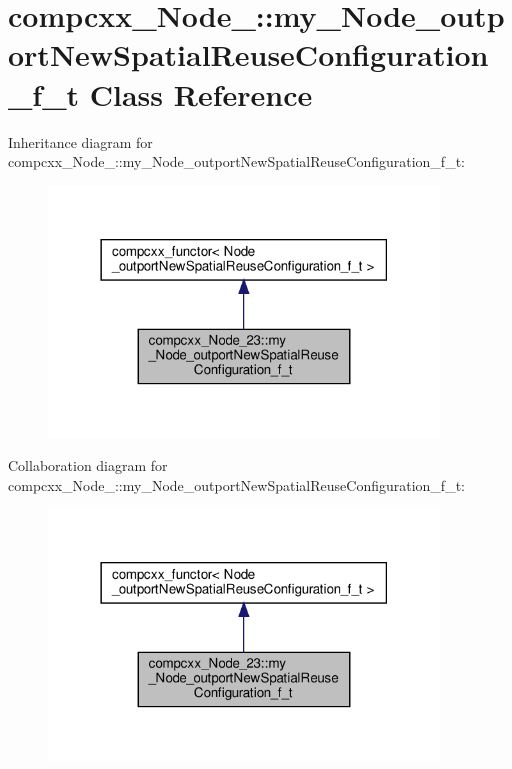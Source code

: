 \hypertarget{classcompcxx__Node__23_1_1my__Node__outportNewSpatialReuseConfiguration__f__t}{}\section{compcxx\+\_\+\+Node\+\_\+:\+:my\+\_\+\+Node\+\_\+outport\+New\+Spatial\+Reuse\+Configuration\+\_\+f\+\_\+t Class Reference}
\label{classcompcxx__Node__23_1_1my__Node__outportNewSpatialReuseConfiguration__f__t}


Inheritance diagram for compcxx\+\_\+\+Node\+\_\+:\+:my\+\_\+\+Node\+\_\+outport\+New\+Spatial\+Reuse\+Configuration\+\_\+f\+\_\+t\+:\nopagebreak
\begin{figure}[H]
\begin{center}
\leavevmode
\includegraphics[width=294pt]{classcompcxx__Node__23_1_1my__Node__outportNewSpatialReuseConfiguration__f__t__inherit__graph}
\end{center}
\end{figure}


Collaboration diagram for compcxx\+\_\+\+Node\+\_\+:\+:my\+\_\+\+Node\+\_\+outport\+New\+Spatial\+Reuse\+Configuration\+\_\+f\+\_\+t\+:\nopagebreak
\begin{figure}[H]
\begin{center}
\leavevmode
\includegraphics[width=294pt]{classcompcxx__Node__23_1_1my__Node__outportNewSpatialReuseConfiguration__f__t__coll__graph}
\end{center}
\end{figure}
